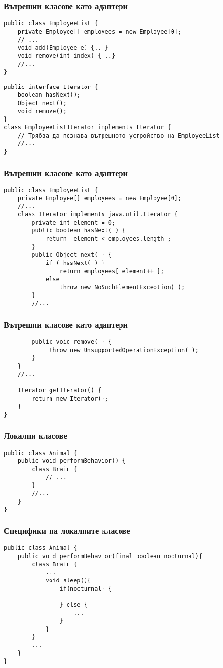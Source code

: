 \documentclass[ignorenonframetext, hyperref=unicode,compress,pdflatex]{beamer}
\begin{document}
\begin{frame}[containsverbatim]\frametitle{Вътрешни класове като адаптери}
\begin{lstlisting}
public class EmployeeList {
	private Employee[] employees = new Employee[0];
	// ...
	void add(Employee e) {...}
	void remove(int index) {...}
	//...
}
\end{lstlisting}
\begin{lstlisting}
public interface Iterator {
	boolean hasNext();
	Object next();
	void remove();
}
class EmployeeListIterator implements Iterator {
	// Трябва да познава вътрешното устройство на EmployeeList
	//...
}
\end{lstlisting}
\end{frame}

\begin{frame}[containsverbatim]\frametitle{Вътрешни класове като адаптери}
\begin{lstlisting}
public class EmployeeList {
    private Employee[] employees = new Employee[0];
    //...
    class Iterator implements java.util.Iterator {
        private int element = 0;
        public boolean hasNext( ) {
            return  element < employees.length ;
        }
        public Object next( ) {
            if ( hasNext( ) )
                return employees[ element++ ];
            else
                throw new NoSuchElementException( );
        }
        //...
\end{lstlisting}
\end{frame}

\begin{frame}[containsverbatim]\frametitle{Вътрешни класове като адаптери}
\begin{lstlisting}
        public void remove( ) {
             throw new UnsupportedOperationException( );
        }
    }
    //...

    Iterator getIterator() {
        return new Iterator();
    }
}
\end{lstlisting}
\end{frame}


\begin{frame}[containsverbatim]\frametitle{Локални класове}
\begin{lstlisting}
public class Animal {
	public void performBehavior() {
		class Brain {
			// ...
		}
		//...
	}
}
\end{lstlisting}
\end{frame}

\begin{frame}[containsverbatim]\frametitle{Специфики на локалните класове}
\begin{lstlisting}
public class Animal {
	public void performBehavior(final boolean nocturnal){
		class Brain {
			...
			void sleep(){
				if(nocturnal) {
					...
				} else {
					...
				}
			}
		}
		...
	}
}
\end{lstlisting}
\end{frame}
\end{document}
